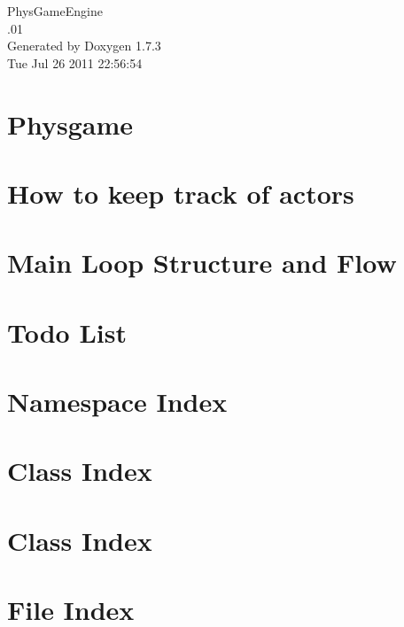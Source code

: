 \documentclass[a4paper]{article}
\begin{document}
\hypersetup{pageanchor=false}
\begin{titlepage}
\vspace*{7cm}
\begin{center}
{\Large PhysGameEngine \\[1ex]\large .01 }\\
\vspace*{1cm}
{\large Generated by Doxygen 1.7.3}\\
\vspace*{0.5cm}
{\small Tue Jul 26 2011 22:56:54}\\
\end{center}
\end{titlepage}
\tableofcontents
{}
\hypersetup{pageanchor=true}
\section{Physgame}
\label{index}\hypertarget{index}{}
\section{How to keep track of actors}
\label{actorcontainer1}
\hypertarget{actorcontainer1}{}

\section{Main Loop Structure and Flow}
\label{mainloop1}
\hypertarget{mainloop1}{}

\section{Todo List}
\label{todo}
\hypertarget{todo}{}

\section{Namespace Index}

\section{Class Index}

\section{Class Index}

\section{File Index}

\end{document}
